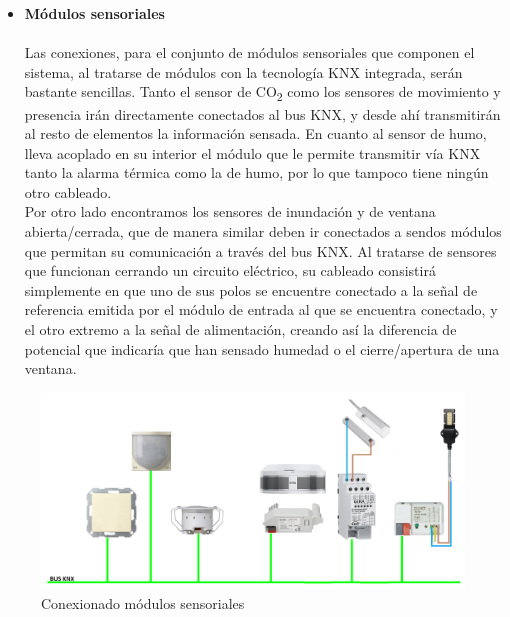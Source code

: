 \begin{itemize}
\item \textbf{Módulos sensoriales} \\ \\
Las conexiones, para el conjunto de módulos sensoriales que componen el sistema, al tratarse de módulos con la tecnología KNX integrada, serán bastante sencillas. Tanto el sensor de CO\textsubscript{2} como los sensores de movimiento y presencia irán directamente conectados al bus KNX, y desde ahí transmitirán al resto de elementos la información sensada. En cuanto al sensor de humo, lleva acoplado en su interior el módulo que le permite transmitir vía KNX tanto la alarma térmica como la de humo, por lo que tampoco tiene ningún otro cableado.\\
Por otro lado encontramos los sensores de inundación y de ventana abierta/cerrada, que de manera similar deben ir conectados a sendos módulos que permitan su comunicación a través del bus KNX. Al tratarse de sensores que funcionan cerrando un circuito eléctrico, su cableado consistirá simplemente en que uno de sus polos se encuentre conectado a la señal de referencia emitida por el módulo de entrada al que se encuentra conectado, y el otro extremo a la señal de alimentación, creando así la diferencia de potencial que indicaría que han sensado humedad o el cierre/apertura de una ventana.
\end{itemize} 
\begin{flushleft}
\begin{figure}[H]
\includegraphics[width=1.15\textwidth]{figures/conex_sensores.png}   
\caption{Conexionado módulos sensoriales}
\label{fig:conex_sensores}
\end{figure}
\end{flushleft}